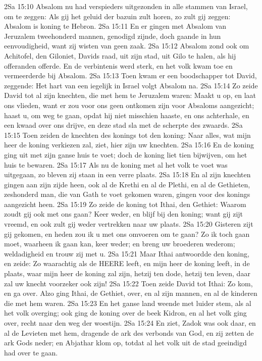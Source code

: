 2Sa 15:10  Absalom nu had verspieders uitgezonden in alle stammen van Israel, om te zeggen: Als gij het geluid der bazuin zult horen, zo zult gij zeggen: Absalom is koning te Hebron.
2Sa 15:11  En er gingen met Absalom van Jeruzalem tweehonderd mannen, genodigd zijnde, doch gaande in hun eenvoudigheid, want zij wisten van geen zaak.
2Sa 15:12  Absalom zond ook om Achitofel, den Giloniet, Davids raad, uit zijn stad, uit Gilo te halen, als hij offeranden offerde. En de verbintenis werd sterk, en het volk kwam toe en vermeerderde bij Absalom.
2Sa 15:13  Toen kwam er een boodschapper tot David, zeggende: Het hart van een iegelijk in Israel volgt Absalom na.
2Sa 15:14  Zo zeide David tot al zijn knechten, die met hem te Jeruzalem waren: Maakt u op, en laat ons vlieden, want er zou voor ons geen ontkomen zijn voor Absaloms aangezicht; haast u, om weg te gaan, opdat hij niet misschien haaste, en ons achterhale, en een kwaad over ons drijve, en deze stad sla met de scherpte des zwaards.
2Sa 15:15  Toen zeiden de knechten des konings tot den koning: Naar alles, wat mijn heer de koning verkiezen zal, ziet, hier zijn uw knechten.
2Sa 15:16  En de koning ging uit met zijn ganse huis te voet; doch de koning liet tien bijwijven, om het huis te bewaren.
2Sa 15:17  Als nu de koning met al het volk te voet was uitgegaan, zo bleven zij staan in een verre plaats.
2Sa 15:18  En al zijn knechten gingen aan zijn zijde heen, ook al de Krethi en al de Plethi, en al de Gethieten, zeshonderd man, die van Gath te voet gekomen waren, gingen voor des konings aangezicht heen.
2Sa 15:19  Zo zeide de koning tot Ithai, den Gethiet: Waarom zoudt gij ook met ons gaan? Keer weder, en blijf bij den koning; want gij zijt vreemd, en ook zult gij weder vertrekken naar uw plaats.
2Sa 15:20  Gisteren zijt gij gekomen, en heden zou ik u met ons omvoeren om te gaan? Zo ik toch gaan moet, waarheen ik gaan kan, keer weder; en breng uw broederen wederom; weldadigheid en trouw zij met u.
2Sa 15:21  Maar Ithai antwoordde den koning, en zeide: Zo waarachtig als de HEERE leeft, en mijn heer de koning leeft, in de plaats, waar mijn heer de koning zal zijn, hetzij ten dode, hetzij ten leven, daar zal uw knecht voorzeker ook zijn!
2Sa 15:22  Toen zeide David tot Ithai: Zo kom, en ga over. Alzo ging Ithai, de Gethiet, over, en al zijn mannen, en al de kinderen die met hem waren.
2Sa 15:23  En het ganse land weende met luider stem, als al het volk overging; ook ging de koning over de beek Kidron, en al het volk ging over, recht naar den weg der woestijn.
2Sa 15:24  En ziet, Zadok was ook daar, en al de Levieten met hem, dragende de ark des verbonds van God, en zij zetten de ark Gods neder; en Abjathar klom op, totdat al het volk uit de stad geeindigd had over te gaan.
